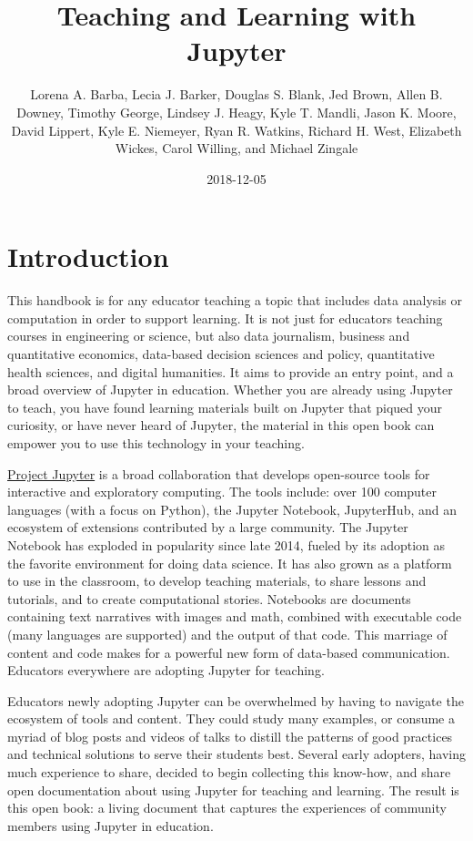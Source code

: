 \documentclass[]{book}
\title{Teaching and Learning with Jupyter}
\author{Lorena A. Barba, Lecia J. Barker, Douglas S. Blank, Jed Brown, Allen B.
Downey, Timothy George, Lindsey J. Heagy, Kyle T. Mandli, Jason K.
Moore, David Lippert, Kyle E. Niemeyer, Ryan R. Watkins, Richard H.
West, Elizabeth Wickes, Carol Willing, and Michael Zingale}
\date{2018-12-05}
\begin{document}
\maketitle

{
\setcounter{tocdepth}{1}
\tableofcontents
}
\chapter{Introduction}\label{intro}

This handbook is for any educator teaching a topic that includes data
analysis or computation in order to support learning. It is not just for
educators teaching courses in engineering or science, but also data
journalism, business and quantitative economics, data-based decision
sciences and policy, quantitative health sciences, and digital
humanities. It aims to provide an entry point, and a broad overview of
Jupyter in education. Whether you are already using Jupyter to teach,
you have found learning materials built on Jupyter that piqued your
curiosity, or have never heard of Jupyter, the material in this open
book can empower you to use this technology in your teaching.

\href{http://jupyter.org/}{Project Jupyter} is a broad collaboration
that develops open-source tools for interactive and exploratory
computing. The tools include: over 100 computer languages (with a focus
on Python), the Jupyter Notebook, JupyterHub, and an ecosystem of
extensions contributed by a large community. The Jupyter Notebook has
exploded in popularity since late 2014, fueled by its adoption as the
favorite environment for doing data science. It has also grown as a
platform to use in the classroom, to develop teaching materials, to
share lessons and tutorials, and to create computational stories.
Notebooks are documents containing text narratives with images and math,
combined with executable code (many languages are supported) and the
output of that code. This marriage of content and code makes for a
powerful new form of data-based communication. Educators everywhere are
adopting Jupyter for teaching.

Educators newly adopting Jupyter can be overwhelmed by having to
navigate the ecosystem of tools and content. They could study many
examples, or consume a myriad of blog posts and videos of talks to
distill the patterns of good practices and technical solutions to serve
their students best. Several early adopters, having much experience to
share, decided to begin collecting this know-how, and share open
documentation about using Jupyter for teaching and learning. The result
is this open book: a living document that captures the experiences of
community members using Jupyter in education.
\end{document}
